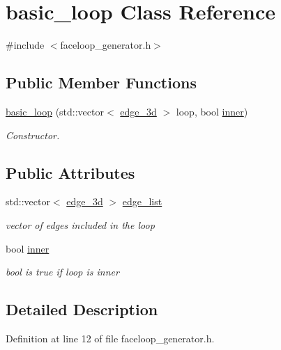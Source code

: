 \hypertarget{classbasic__loop}{}\section{basic\+\_\+loop Class Reference}
\label{classbasic__loop}


{\ttfamily \#include $<$faceloop\+\_\+generator.\+h$>$}

\subsection*{Public Member Functions}
\begin{DoxyCompactItemize}
\item 
\hyperlink{classbasic__loop_a400c87feeca18d4e1c5885adccc5b3a1}{basic\+\_\+loop} (std\+::vector$<$ \hyperlink{classedge__3d}{edge\+\_\+3d} $>$ loop, bool \hyperlink{classbasic__loop_a79ff39c7f385ef03176dca8c675844fe}{inner})
\begin{DoxyCompactList}\small\item\em Constructor. \end{DoxyCompactList}\end{DoxyCompactItemize}
\subsection*{Public Attributes}
\begin{DoxyCompactItemize}
\item 
std\+::vector$<$ \hyperlink{classedge__3d}{edge\+\_\+3d} $>$ \hyperlink{classbasic__loop_a81512ce2e37b1de9142568113140ace9}{edge\+\_\+list}
\begin{DoxyCompactList}\small\item\em vector of edges included in the loop \end{DoxyCompactList}\item 
bool \hyperlink{classbasic__loop_a79ff39c7f385ef03176dca8c675844fe}{inner}
\begin{DoxyCompactList}\small\item\em bool is true if loop is inner \end{DoxyCompactList}\end{DoxyCompactItemize}


\subsection{Detailed Description}


Definition at line 12 of file faceloop\+\_\+generator.\+h.



